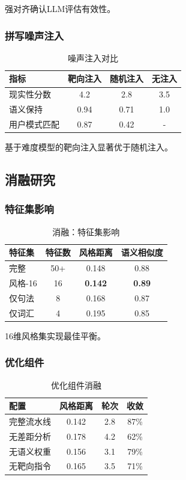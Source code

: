 \documentclass[11pt,a4paper]{article}
\begin{document}
强对齐确认LLM评估有效性。

\subsubsection{拼写噪声注入}

\begin{table}[h]
\centering
\begin{tabular}{lccc}
\toprule
\textbf{指标} & \textbf{靶向注入} & \textbf{随机注入} & \textbf{无注入} \\
\midrule
现实性分数 & 4.2 & 2.8 & 3.5 \\
语义保持 & 0.94 & 0.71 & 1.0 \\
用户模式匹配 & 0.87 & 0.42 & - \\
\bottomrule
\end{tabular}
\caption{噪声注入对比}
\label{tab:noise}
\end{table}

基于难度模型的靶向注入显著优于随机注入。

\subsection{消融研究}

\subsubsection{特征集影响}

\begin{table}[h]
\centering
\begin{tabular}{lccc}
\toprule
\textbf{特征集} & \textbf{特征数} & \textbf{风格距离} & \textbf{语义相似度} \\
\midrule
完整 & 50+ & 0.148 & 0.88 \\
风格-16 & 16 & \textbf{0.142} & \textbf{0.89} \\
仅句法 & 8 & 0.168 & 0.87 \\
仅词汇 & 4 & 0.195 & 0.85 \\
\bottomrule
\end{tabular}
\caption{消融：特征集影响}
\label{tab:ablation_features}
\end{table}

16维风格集实现最佳平衡。

\subsubsection{优化组件}

\begin{table}[h]
\centering
\begin{tabular}{lccc}
\toprule
\textbf{配置} & \textbf{风格距离} & \textbf{轮次} & \textbf{收敛} \\
\midrule
完整流水线 & 0.142 & 2.8 & 87\% \\
无差距分析 & 0.178 & 4.2 & 62\% \\
无语义权重 & 0.156 & 3.1 & 79\% \\
无靶向指令 & 0.165 & 3.5 & 71\% \\
\bottomrule
\end{tabular}
\caption{优化组件消融}
\label{tab:ablation_components}
\end{table}
\end{document}
